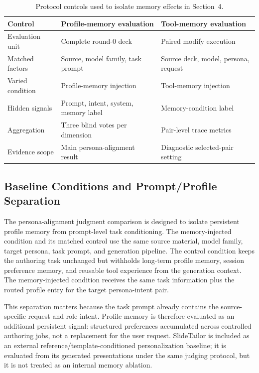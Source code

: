 \documentclass{llmxive}
\begin{document}
\begin{table}[!htbp]
\centering
\small
\setlength{\tabcolsep}{5pt}
\begin{tabular}{lll}
\toprule
Control & Profile-memory evaluation & Tool-memory evaluation \\
\midrule
Evaluation unit & Complete round-0 deck & Paired modify execution \\
Matched factors & Source, model family, task prompt & Source deck, model, persona, request \\
Varied condition & Profile-memory injection & Tool-memory injection \\
Hidden signals & Prompt, intent, system, memory label & Memory-condition label \\
Aggregation & Three blind votes per dimension & Pair-level trace metrics \\
Evidence scope & Main persona-alignment result & Diagnostic selected-pair setting \\
\bottomrule
\end{tabular}
    
\caption{Protocol controls used to isolate memory effects in Section~4.}
\label{tab:appendix_eval_protocol_summary}
\end{table}

\subsection{Baseline Conditions and Prompt/Profile Separation}
\label{app:baseline_provenance}

The persona-alignment judgment comparison is designed to isolate persistent profile
memory from prompt-level task conditioning. The memory-injected condition and
its matched control use the same source material, model family, target persona,
task prompt, and generation pipeline. The control condition keeps the authoring
task unchanged but withholds long-term profile memory, session preference
memory, and reusable tool experience from the generation context. The
memory-injected condition receives the same task information plus the routed
profile entry for the target persona-intent pair.

This separation matters because the task prompt already contains the
source-specific request and role intent. Profile memory is therefore evaluated
as an additional persistent signal: structured preferences accumulated across
controlled authoring jobs, not a replacement for the user request. SlideTailor is
included as an external reference/template-conditioned personalization baseline;
it is evaluated from its generated presentations under the same judging
protocol, but it is not treated as an internal memory ablation.
\end{document}
